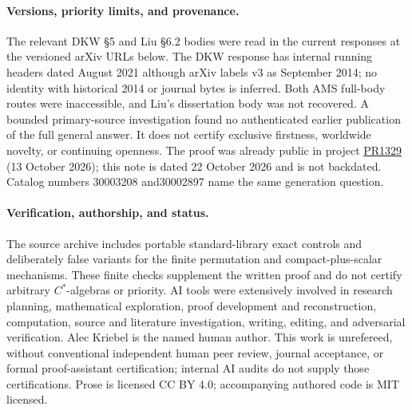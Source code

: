\documentclass[11pt]{article}
\begin{document}
\paragraph{Versions, priority limits, and provenance.}
The relevant DKW \S5 and Liu \S6.2 bodies were read in the current
responses at the versioned arXiv URLs below. The DKW response has
internal running headers dated August 2021 although arXiv labels v3
as September 2014; no identity with historical 2014 or journal bytes is
inferred. Both AMS full-body routes were inaccessible, and Liu's
dissertation body was not recovered. A bounded primary-source
investigation found no authenticated earlier publication of the full
general answer. It does not certify exclusive firstness, worldwide
novelty, or continuing openness. The proof was already public in project
\href{https://github.com/AlecKriebel/Math/pull/1329}{PR1329}
(13 October 2026); this note is dated 22 October 2026 and is not backdated.
Catalog numbers 30003208 and30002897 name the same generation question.

\paragraph{Verification, authorship, and status.}
The source archive includes portable standard-library exact controls
and deliberately false variants for the finite permutation and
compact-plus-scalar mechanisms. These finite checks supplement the
written proof and do not certify arbitrary \(C^*\)-algebras or priority.
AI tools were extensively involved in research planning, mathematical
exploration, proof development and reconstruction, computation, source
and literature investigation, writing, editing, and adversarial
verification. Alec Kriebel is the named human author.
This work is unrefereed, without conventional independent human peer
review, journal acceptance, or formal proof-assistant certification;
internal AI audits do not supply those certifications.
Prose is licensed CC BY 4.0; accompanying authored code is MIT licensed.
\end{document}
